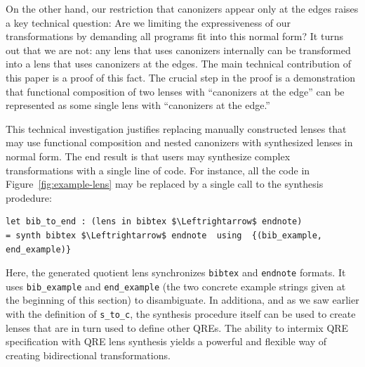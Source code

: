\documentclass[acmsmall,review,anonymous]{acmart}\settopmatter{printfolios=true,printccs=false,printacmref=false}
\newcommand{\FINISH}[3]{\ifdraft\textcolor{#1}{[#2: #3]}\fi}
\newcommand{\sam}[1]{\FINISH{dkpurple}{SM}{#1}}
\newcommand{\bibtex}{\textsc{Bib}\TeX{}}
\newcommand{\cd}[1]{\lstinline[backgroundcolor=\color{white}]$#1$}
\begin{document}
On the other hand, our restriction that canonizers appear only at the edges
raises a key technical question:  Are we limiting the expressiveness of our transformations
by demanding all programs fit into this normal form?  It turns out that we are not:
any lens that uses canonizers internally can be transformed into a lens that uses canonizers
at the edges.  The main technical contribution of this paper is a proof of this fact.  The
crucial step in the proof is a demonstration that functional composition of two lenses
with ``canonizers at the edge'' can be represented as some single lens with ``canonizers at the
edge.''




This technical investigation justifies replacing manually constructed lenses that may use
functional composition and nested canonizers with synthesized lenses in normal form.
The end result is that users may synthesize complex transformations with a single line
of code.  For instance, all the code in Figure~\ref{fig:example-lens} may be replaced by
a single call to the synthesis prodedure:

\begin{lstlisting}
let bib_to_end : (lens in bibtex $\Leftrightarrow$ endnote)
= synth bibtex $\Leftrightarrow$ endnote  using  {(bib_example, end_example)}
\end{lstlisting}
\noindent Here, the generated  quotient lens synchronizes \cd{bibtex} and
\cd{endnote} formats.  It uses \cd{bib_example} and \cd{end_example} (the two concrete example
strings given at the beginning of this section) to disambiguate.
In additiona, and as we saw earlier with the definition of \cd{s_to_c}, the synthesis procedure itself
can be used to create lenses that are in turn used to define other QREs.  The ability to intermix
QRE specification with QRE lens synthesis yields a powerful and flexible way of
creating bidirectional transformations.
\end{document}
